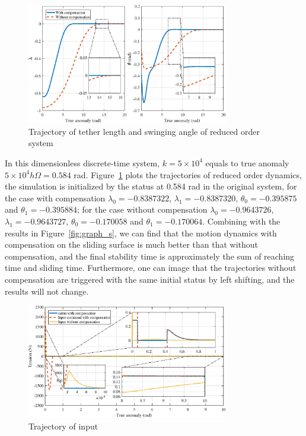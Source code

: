 \documentclass[10pt,final,journal]{IEEEtran}
\begin{document}
\begin{figure}[htbp] 
	\centering
\includegraphics[width=250pt]{reducedsystem.eps}
\caption{Trajectory of tether length and swinging angle of reduced order  system} \label{fig:graph_reduced_system}
\end{figure} 

In this dimensionless discrete-time system, $k=5\times 10^4$ equals to true anomaly $5\times 10^4h\Omega=0.584 $ rad. Figure~\ref{fig:graph_reduced_system} plots the trajectories of reduced order  dynamics, the simulation is initialized by the status at 0.584 rad in the original system, for the case with compensation $\lambda_0 =-0.8387322$, $\lambda_1 =-0.8387320$, $\theta_0 =-0.395875$ and $\theta_1 =-0.395884$; for the case without compensation $\lambda_0 =-0.9643726$, $\lambda_1 =-0.9643727$, $\theta_0 =-0.170058$ and $\theta_1 =-0.170064$. Combining with the results in Figure~\ref{fig:graph_s}, we can find that the motion dynamics with compensation on the sliding surface is much better than that without compensation, and the final stability time is approximately the sum of reaching time and sliding time. Furthermore, one can image that the trajectories without compensation are triggered with the same initial status by left shifting, and the results will not change. 
 
\begin{figure}[htbp] 
	\centering
\includegraphics[width=250pt]{input.eps}
\caption{Trajectory of input} \label{fig:graph_input}
\end{figure} 
\end{document}
